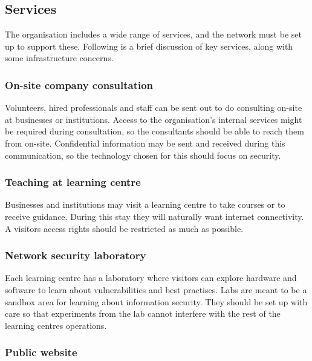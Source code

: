 \subsection{Services}

The organisation includes a wide range of services, and the network must be set up to support these. Following is a brief discussion of key services, along with some infrastructure concerns.


\subsubsection{On-site company consultation}

Volunteers, hired professionals and staff  can be sent out to do consulting on-site at businesses or institutions. Access to the organisation's internal services might be required during consultation, so the consultants should be able to reach them from on-site. Confidential information may be sent and received during this communication, so the technology chosen for this should focus on security.

\subsubsection{Teaching at learning centre}

Businesses and institutions may visit a learning centre to take courses or to receive guidance. During this stay they will naturally want internet connectivity. A visitors access rights should be restricted as much as possible.

\subsubsection{Network security laboratory}

Each learning centre has a laboratory where visitors can explore hardware and software to learn about vulnerabilities and best practises. Labs are meant to be a sandbox area for learning about information security. They should be set up with care so that experiments from the lab cannot interfere with the rest of the learning centres operations.


\subsubsection{Public website}

